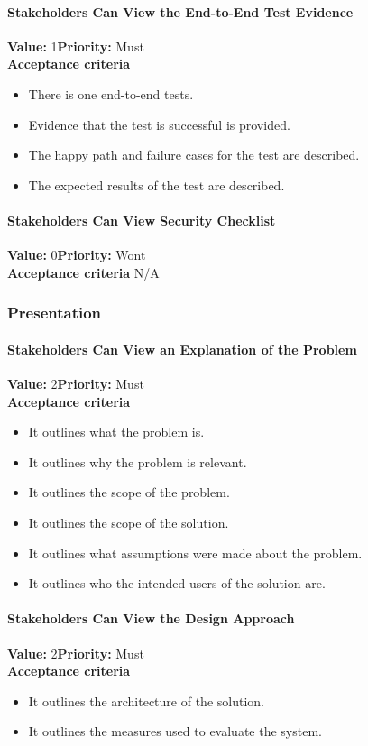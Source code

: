 \paragraph{Stakeholders Can View the End-to-End Test Evidence}
\textbf{Value:} 1\quad \textbf{Priority:} Must\\
\textbf{Acceptance criteria}
\begin{itemize}
  \item There is one end-to-end tests.
  \item Evidence that the test is successful is provided.
  \item The happy path and failure cases for the test are described.
  \item The expected results of the test are described.
\end{itemize}

\paragraph{Stakeholders Can View Security Checklist}
\textbf{Value:} 0\quad \textbf{Priority:} Wont\\
\textbf{Acceptance criteria} N/A

\subsubsection{Presentation}

\paragraph{Stakeholders Can View an Explanation of the Problem}
\textbf{Value:} 2\quad \textbf{Priority:} Must\\
\textbf{Acceptance criteria}
\begin{itemize}
  \item It outlines what the problem is.
  \item It outlines why the problem is relevant.
  \item It outlines the scope of the problem.
  \item It outlines the scope of the solution.
  \item It outlines what assumptions were made about the problem.
  \item It outlines who the intended users of the solution are.
\end{itemize}

\paragraph{Stakeholders Can View the Design Approach}
\textbf{Value:} 2\quad \textbf{Priority:} Must\\
\textbf{Acceptance criteria}
\begin{itemize}
  \item It outlines the architecture of the solution.
  \item It outlines the measures used to evaluate the system.
\end{itemize}

